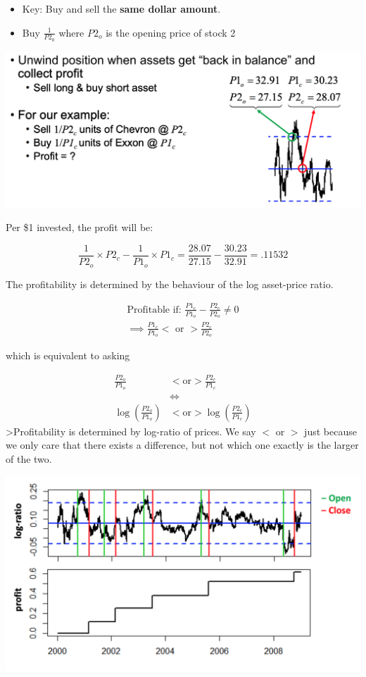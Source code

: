 \documentclass[
  oneside]{book}
\providecommand{\tightlist}{%
  \setlength{\itemsep}{0pt}\setlength{\parskip}{0pt}}
\begin{document}
\begin{itemize}
\tightlist
\item
  Key: Buy and sell the \textbf{same dollar amount}.
\item
  Buy \(\frac{1}{P2_{0}}\) where \(P2_{o}\) is the opening price of stock 2
\end{itemize}

\includegraphics{Notes/Obsidian-Attachments/9-Statistical-Arbitrage-3.png}

Per \$1 invested, the profit will be:

\[
\frac{1}{P2_{o}}\times P2_{c}-\frac{1}{P1_{o}}\times P1_{c} = \frac{28.07}{27.15}-\frac{30.23}{32.91} = .11532
\]

The profitability is determined by the behaviour of the log asset-price ratio.

\[
\begin{gathered}
\text{Profitable if: } \frac{P1_{c}}{P1_{o}} - \frac{P2_{c}}{P2_{o}} \ne 0\\
\implies \frac{P1_{c}}{P1_{o}} < \text{ or }> \frac{P2_{c}}{P2_{o}}
\end{gathered}
\]

which is equivalent to asking

\[
\begin{aligned}
\frac{P2_{o}}{P1_{o}} &< \text{or} > \frac{P2_{c}}{P1_{c}}\\
&\iff\\
\log(\frac{P2_{o}}{P1_{o}}) &< \text{or} > \log(\frac{P2_{c}}{P1_{c}})
\end{aligned}
\]
\textgreater Profitability is determined by log-ratio of prices. We say \(< \text{ or } >\) just because we only care that there exists a difference, but not which one exactly is the larger of the two.

\includegraphics{Notes/Obsidian-Attachments/9-Statistical-Arbitrage-5.png}
\end{document}
